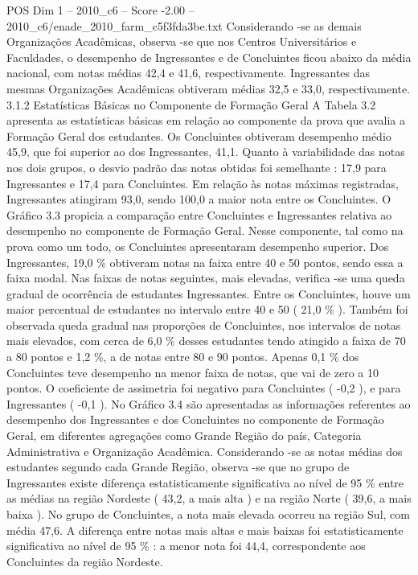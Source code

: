 \begin{textsample}{POS Dim 1 – 2010\_c6 – Score -2.00 – 2010\_c6/enade\_2010\_farm\_c5f3fda3be.txt}
Considerando -se as demais Organizações Acadêmicas, observa -se que nos Centros Universitários e Faculdades, o desempenho de Ingressantes e de Concluintes ficou abaixo da média nacional, com notas médias 42,4 e 41,6, respectivamente.
Ingressantes das mesmas Organizações Acadêmicas obtiveram médias 32,5 e 33,0, respectivamente. 3.1.2 Estatísticas Básicas no Componente de Formação Geral A Tabela 3.2 apresenta as estatísticas básicas em relação ao componente da prova que avalia a Formação Geral dos estudantes.
Os Concluintes obtiveram desempenho médio 45,9, que foi superior ao dos Ingressantes, 41,1.
Quanto à variabilidade das notas nos dois grupos, o desvio padrão das notas obtidas foi semelhante : 17,9 para Ingressantes e 17,4 para Concluintes.
Em relação às notas máximas registradas, Ingressantes atingiram 93,0, sendo 100,0 a maior nota entre os Concluintes.
O Gráfico 3.3 propicia a comparação entre Concluintes e Ingressantes relativa ao desempenho no componente de Formação Geral.
Nesse componente, tal como na prova como um todo, os Concluintes apresentaram desempenho superior.
Dos Ingressantes, 19,0 \% obtiveram notas na faixa entre 40 e 50 pontos, sendo essa a faixa modal.
Nas faixas de notas seguintes, mais elevadas, verifica -se uma queda gradual de ocorrência de estudantes Ingressantes.
Entre os Concluintes, houve um maior percentual de estudantes no intervalo entre 40 e 50 ( 21,0 \% ).
Também foi observada queda gradual nas proporções de Concluintes, nos intervalos de notas mais elevados, com cerca de 6,0 \% desses estudantes tendo atingido a faixa de 70 a 80 pontos e 1,2 \%, a de notas entre 80 e 90 pontos.
Apenas 0,1 \% dos Concluintes teve desempenho na menor faixa de notas, que vai de zero a 10 pontos.
O coeficiente de assimetria foi negativo para Concluintes ( -0,2 ), e para Ingressantes ( -0,1 ).
No Gráfico 3.4 são apresentadas as informações referentes ao desempenho dos Ingressantes e dos Concluintes no componente de Formação Geral, em diferentes agregações como Grande Região do país, Categoria Administrativa e Organização Acadêmica.
Considerando -se as notas médias dos estudantes segundo cada Grande Região, observa -se que no grupo de Ingressantes existe diferença estatisticamente significativa ao nível de 95 \% entre as médias na região Nordeste ( 43,2, a mais alta ) e na região Norte ( 39,6, a mais baixa ).
No grupo de Concluintes, a nota mais elevada ocorreu na região Sul, com média 47,6.
A diferença entre notas mais altas e mais baixas foi estatisticamente significativa ao nível de 95 \% : a menor nota foi 44,4, correspondente aos Concluintes da região Nordeste.

\end{textsample}

